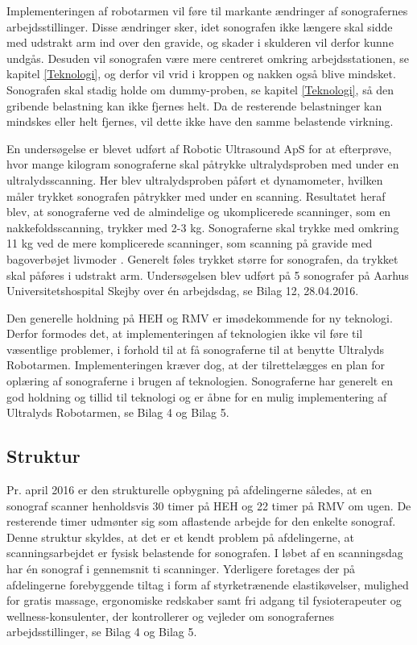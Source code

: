 Implementeringen af robotarmen vil føre til markante ændringer af sonografernes arbejdsstillinger. Disse ændringer sker, idet sonografen ikke længere skal sidde med udstrakt arm ind over den gravide, og skader i skulderen vil derfor kunne undgås. Desuden vil sonografen være mere centreret omkring arbejdsstationen, se kapitel \ref{Teknologi}, og derfor vil vrid i kroppen og nakken også blive mindsket. Sonografen skal stadig holde om dummy-proben, se kapitel \ref{Teknologi}, så den gribende belastning kan ikke fjernes helt. Da de resterende belastninger kan mindskes eller helt fjernes, vil dette ikke have den samme belastende virkning. 

En undersøgelse er blevet udført af Robotic Ultrasound ApS for at efterprøve, hvor mange kilogram sonograferne skal påtrykke ultralydsproben med under en ultralydsscanning. Her blev ultralydsproben påført et dynamometer, hvilken måler trykket sonografen påtrykker med under en scanning. Resultatet heraf blev, at sonograferne ved de almindelige og ukomplicerede scanninger, som en nakkefoldsscanning, trykker med 2-3 kg. Sonograferne skal trykke med omkring 11 kg ved de mere komplicerede scanninger, som scanning på gravide med bagoverbøjet livmoder \cite{livmoder}. Generelt føles trykket større for sonografen, da trykket skal påføres i udstrakt arm. Undersøgelsen blev udført på 5 sonografer på Aarhus Universitetshospital Skejby over én arbejdsdag, se Bilag 12, 28.04.2016.

Den generelle holdning på HEH og RMV er imødekommende for ny teknologi. Derfor formodes det, at implementeringen af teknologien ikke vil føre til væsentlige problemer, i forhold til at få sonograferne til at benytte Ultralyds Robotarmen. Implementeringen kræver dog, at der tilrettelægges en plan for oplæring af sonograferne i brugen af teknologien. Sonograferne har generelt en god holdning og tillid til teknologi og er åbne for en mulig implementering af Ultralyds Robotarmen, se Bilag 4 og Bilag 5.

\subsection{Struktur}
Pr. april 2016 er den strukturelle opbygning på afdelingerne således, at en sonograf scanner henholdsvis 30 timer på HEH og 22 timer på RMV om ugen. De resterende timer udmønter sig som aflastende arbejde for den enkelte sonograf. Denne struktur skyldes, at det er et kendt problem på afdelingerne, at scanningsarbejdet er fysisk belastende for sonografen. I løbet af en scanningsdag har én sonograf i gennemsnit ti scanninger. Yderligere foretages der på afdelingerne forebyggende tiltag i form af styrketrænende elastikøvelser, mulighed for gratis massage, ergonomiske redskaber samt fri adgang til fysioterapeuter og wellness-konsulenter, der kontrollerer og vejleder om sonografernes arbejdsstillinger, se Bilag 4 og Bilag 5.

